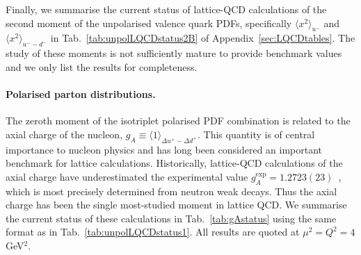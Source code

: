 Finally, we summarise the current status of lattice-QCD calculations of the 
second moment of the unpolarised valence quark PDFs, specifically 
$\langle x^2 \rangle_{u^-}$ and $\langle x^2\rangle_{u^--d^-}$
in Tab.~\ref{tab:unpolLQCDstatus2B} of Appendix~\ref{sec:LQCDtables}.
% 
The study of these moments is not sufficiently mature to provide benchmark 
values and we only list the results for completeness.

\paragraph{Polarised parton distributions.}
The zeroth moment of the isotriplet polarised PDF combination is related to the 
axial charge of the nucleon, $g_A\equiv \langle 1\rangle_{\Delta u^+-\Delta d^+}$.
%
This quantity is of central importance to nucleon physics and has long been 
considered an important benchmark for lattice calculations. 
%
Historically, lattice-QCD calculations of the axial charge have underestimated 
the experimental value $g_A^{\mathrm{exp}} = 1.2723(23)$~\cite{Olive:2016xmw}, 
which is most precisely determined from neutron weak decays. 
%
Thus the axial charge has been the single most-studied moment in lattice QCD.
%
We summarise the current status of these calculations in 
Tab.~\ref{tab:gAstatus} using the same format as in 
Tab.~\ref{tab:unpolLQCDstatus1}.
%
All results are quoted at $\mu^2=Q^2=4$ GeV$^2$.

